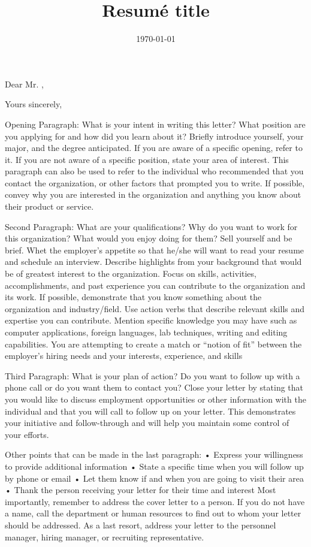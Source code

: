 \documentclass[12pt,a4paper,roman, colorlinks, linkcolor=cyan]{moderncv}
\title{Resumé title}
\begin{document}
\hypersetup{urlcolor= blue}

\date{\today} 
\opening{Dear Mr. ,} 
\closing{Yours sincerely,}

\makelettertitle

Opening Paragraph: What is your intent in writing this letter? What
position are you applying for and how did you learn about it? Briefly
introduce yourself, your major, and the degree anticipated. If you are
aware of a specific opening, refer to it. If you are not aware of a
specific position, state your area of interest. This  paragraph can
also be used to refer to the individual who  recommended that you
contact the organization, or other factors that prompted you to write.
If possible, convey why you are  interested in the organization and
anything you know about their product or service.

Second Paragraph: What are your qualifications? Why do you want to
work for this organization? What would you enjoy doing for them? Sell
yourself and be brief. Whet the employer’s appetite so that he/she
will want to read your resume and schedule an interview. Describe
highlights from your background that would be of greatest interest to
the organization. Focus on skills, activities, accomplishments, and
past experience you can contribute to the organization and its work.
If possible, demonstrate that you know something about the
organization and industry/field. Use action verbs that describe
relevant skills and expertise you can contribute. Mention specific
knowledge you may have such as computer applications, foreign
languages, lab techniques, writing and editing capabilities. You are
attempting to create a match or “notion of fit” between the employer’s
hiring needs and your  interests, experience, and skills

Third Paragraph: What is your plan of action? Do you want to follow up
with a phone call or do you want them to contact you? Close your
letter by stating that you would like to discuss employment
opportunities or other information with the individual and that you
will call to follow up on your letter. This demonstrates your
initiative and follow-through and will help you maintain some control
of your efforts.

Other points that can be made in the last paragraph: • Express your
willingness to provide additional information • State a specific time
when you will follow up by phone or email • Let them know if and when
you are going to visit their area • Thank the person receiving your
letter for their time and interest Most importantly, remember to
address the cover letter to a person. If you do not have a name, call
the department or human resources to find out to whom your letter
should be addressed. As a last resort, address your letter to the
personnel manager, hiring manager, or recruiting representative.

\makeletterclosing
\end{document}
